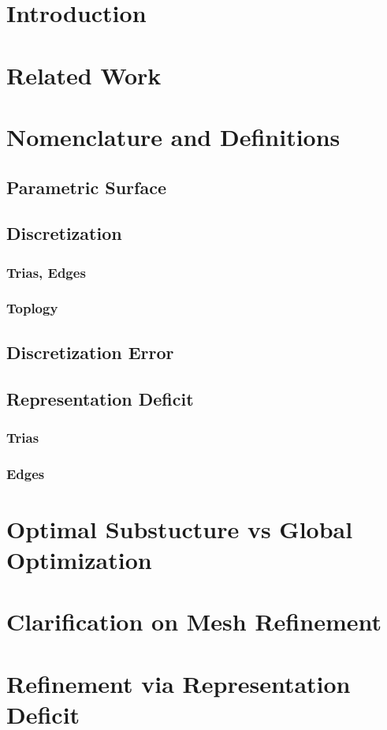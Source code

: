 \documentclass[11pt]{article}
\begin{document}
\section{Introduction}
\section{Related Work}
\section{Nomenclature and Definitions}
\subsection{Parametric Surface}
\subsection{Discretization}
\subsubsection{Trias, Edges}
\subsubsection{Toplogy}
\subsection{Discretization Error}
\subsection{Representation Deficit}
\subsubsection{Trias}
\subsubsection{Edges}
\section{Optimal Substucture vs Global Optimization}
\section{Clarification on Mesh Refinement}
\section{Refinement via Representation Deficit}
\end{document}
